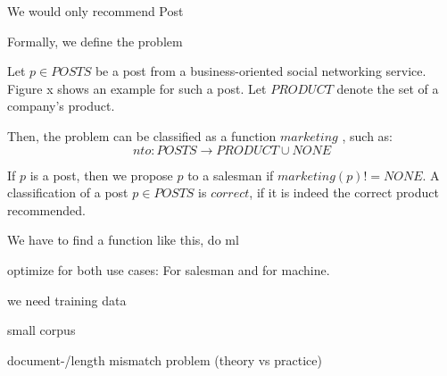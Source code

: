 We would only recommend Post

Formally, we define the problem  

Let $p \in POSTS$ be a post from a business-oriented social networking service.
Figure x shows an example for such a post.
Let $PRODUCT$ denote the set of a company's product.

Then, the problem can be classified as a function $marketing$ , such as:
\begin{displaymath}
	nto: POSTS \to PRODUCT \cup {NONE}
\end{displaymath}

If $p$ is a post, then we propose $p$ to a salesman if $marketing(p) != NONE$.
A classification of a post $p \in POSTS$ is $correct$, if it is indeed the correct product recommended.

We have to find a function like this, do ml

optimize for both use cases: For salesman and for machine.

we need training data

small corpus

document-/length mismatch problem (theory vs practice)


